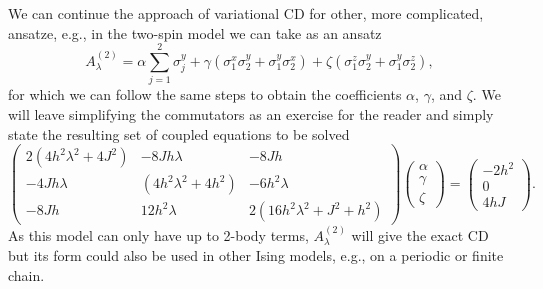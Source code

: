 We can continue the approach of variational CD for other, more complicated, ansatze, e.g., in the two-spin model we can take as an ansatz
\begin{equation}
     A^{(2)}_\lambda = \alpha \sum_{j=1}^2 \sigma_j^y +  \gamma (\sigma_1^x \sigma_{2}^y + \sigma_1^y \sigma_{2}^x) +  \zeta (\sigma_1^z \sigma_{2}^y + \sigma_1^y \sigma_{2}^z),
\end{equation}
for which we can follow the same steps to obtain the coefficients $\alpha$, $\gamma$, and $\zeta$. We will leave simplifying the commutators as an exercise for the reader and simply state the resulting set of coupled equations to be solved
\begin{equation}
    \begin{pmatrix}
2\left( 4 h^2 \lambda^2 + 4 J^2 \right) & -8Jh\lambda & -8Jh \\ 
-4Jh \lambda &  \left(  4 h^2 \lambda^2 + 4h^2 \right) & -6 h^2 \lambda \\
-8 Jh & 12 h^2 \lambda & 2 \left(16 h^2 \lambda^2 + J^2 + h^2 \right)
\end{pmatrix}
\begin{pmatrix}
\alpha \\ \gamma \\ \zeta
\end{pmatrix}  = 
\begin{pmatrix}
-2h^2 \\ 0 \\ 4hJ
\end{pmatrix}.
\end{equation}
 As this model can only have up to 2-body terms, $A^{(2)}_\lambda$ will give the exact CD but its form could also be used in other Ising models, e.g., on a periodic or finite chain.

\fi

